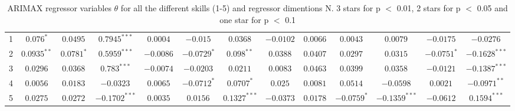 \begin{landscape}
\begin{table}[]
\begin{tabular}{|c|c c c c c c c c c c c c|}
         1 & $0.076^{*}$ & $0.0495^{}$ & $0.7945^{***}$ & $0.0004^{}$ & $-0.015^{}$ & $0.0368^{}$ & $-0.0102^{}$ & $0.0066^{}$ & $0.0043^{}$ & $0.0079^{}$ & $-0.0175^{}$ & $-0.0276^{}$\\
         2 & $0.0935^{**}$ & $0.0781^{*}$ & $0.5959^{***}$ & $-0.0086^{}$ & $-0.0729^{*}$ & $0.098^{**}$ & $0.0388^{}$ & $0.0407^{}$ & $0.0297^{}$ & $0.0315^{}$ & $-0.0751^{*}$ & $-0.1628^{***}$\\
         3 & $0.0296^{}$ & $0.0368^{}$ & $0.783^{***}$ & $-0.0074^{}$ & $-0.0203^{}$ & $0.0211^{}$ & $0.0083^{}$ & $0.0463^{}$ & $0.0399^{}$ & $0.0358^{}$ & $-0.0121^{}$ & $-0.1387^{***}$\\
         4 & $0.0056^{}$ & $0.0183^{}$ & $-0.0323^{}$ & $0.0065^{}$ & $-0.0712^{*}$ & $0.0707^{*}$ & $0.025^{}$ & $0.0081^{}$ & $0.0514^{}$ & $-0.0598^{}$ & $0.0021^{}$ & $-0.0971^{**}$\\
         5 & $0.0275^{}$ & $0.0272^{}$ & $-0.1702^{***}$ & $0.0035^{}$ & $0.0156^{}$ & $0.1327^{***}$ & $-0.0373^{}$ & $0.0178^{}$ & $-0.0759^{*}$ & $-0.1359^{***}$ & $-0.0612^{}$ & $0.1594^{***}$\\
        \hline
    \end{tabular}
    \caption{ARIMAX regressor variables $\theta$ for all the different skills (1-5) and regressor dimentions N. 3 stars for p $<$ 0.01, 2 stars for p $<$ 0.05 and one star for p $<$ 0.1}
    \label{tab:varimax_regressor_variables}
\end{table}


\end{landscape}
